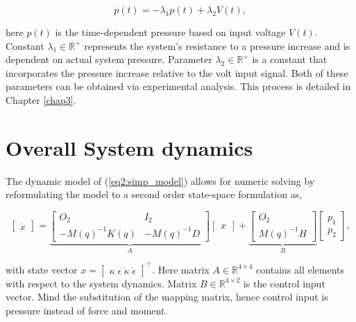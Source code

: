 \begin{equation}
    \dot{p}(t) = -\lambda_1 p(t) + \lambda_2 V(t),
\end{equation}

here $p(t)$ is the time-dependent pressure based on input voltage $V(t)$. Constant $\lambda_1 \in \mathbb{R}^+$ represents the system's resistance to a pressure increase and is dependent on actual system pressure. Parameter $\lambda_2 \in \mathbb{R}^+$ is a constant that incorporates the pressure increase relative to the volt input signal. Both of these parameters can be obtained via experimental analysis. This process is detailed in Chapter \ref{chap3}.



\section{Overall System dynamics}

The dynamic model of (\ref{eq2:simp_model}) allows for numeric solving by reformulating the model to a second order state-space formulation as,

\begin{equation}
     \begin{bmatrix} \dot{x}  \end{bmatrix}   = \underbrace{  \begin{bmatrix} O_2 & I_2 \\ -M(q)^{-1}K(q)  & -M(q)^{-1} D \end{bmatrix}   }_{A} \begin{bmatrix} x \end{bmatrix}  +      \underbrace{\begin{bmatrix} O_2 \\ M(q)^{-1}H   \end{bmatrix}   }_{B}    \begin{bmatrix} p_1\\ p_2  
     \end{bmatrix}, 
     \label{eq4:SS}
\end{equation}

with state vector $x = \begin{bmatrix} \kappa \hspace{3pt} \epsilon \hspace{3pt} \dot{\kappa}  \hspace{3pt} \dot{\epsilon}  \end{bmatrix}^{\top}$. Here matrix $A \in \mathbb{R}^{4\times 4}$ contains all elements with respect to the system dynamics. Matrix $B\in\mathbb{R}^{4 \times 2}$ is the control input vector. Mind the substitution of the mapping matrix, hence control input is pressure instead of force and moment. 

